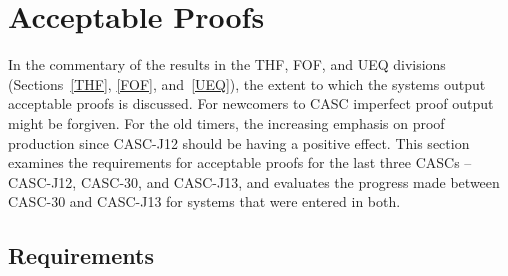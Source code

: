 \documentclass[aic]{iosart2x}
\newcommand{\LAST}{\mbox{CASC-30}}
\newcommand{\THIS}{\mbox{CASC-J13}}
\begin{document}
\section{Acceptable Proofs}
\label{Acceptable}

In the commentary of the results in the THF, FOF, and UEQ divisions (Sections~\ref{THF}, \ref{FOF}, 
and~\ref{UEQ}), the extent to which the systems output acceptable proofs is discussed.
For newcomers to CASC imperfect proof output might be forgiven.
For the old timers, the increasing emphasis on proof production since CASC-J12 should be
having a positive effect.
This section examines the requirements for acceptable proofs for the last three CASCs -- CASC-J12,
\LAST{}, and \THIS{}, and evaluates the progress made between \LAST{} and \THIS{} for systems
that were entered in both.

\subsection{Requirements}
\label{Requirements}
\end{document}
